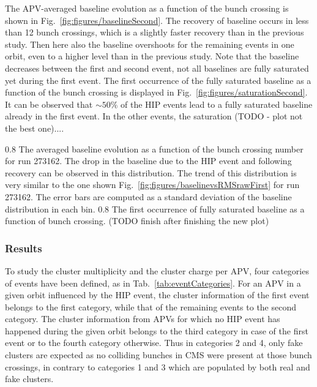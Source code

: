 The APV-averaged baseline evolution as a function of the bunch crossing is shown in Fig.~\ref{fig:figures/baselineSecond}. The recovery of baseline occurs in less than 12 bunch crossings, which is a slightly faster recovery than in the previous study. Then here also the baseline overshoots for the remaining events in one orbit, even to a higher level than in the previous study. Note that the baseline decreases between the first and second event, not all baselines are fully saturated yet during the first event. The first occurrence of the fully saturated baseline as a function of the bunch crossing is displayed in Fig.~\ref{fig:figures/saturationSecond}. It can be observed that $\sim 50\%$ of the HIP events lead to a fully saturated baseline already in the first event. In the other events, the saturation (TODO - plot not the best one)....

                 {0.8}       %
                 {The averaged baseline evolution as a function of the bunch crossing number for run 273162. The drop in the baseline due to the HIP event and following recovery can be observed in this distribution. The trend of this distribution is very similar to the one shown Fig.~\ref{fig:figures/baselinevsRMSrawFirst} for run 273162. The error bars are computed as a standard deviation of the baseline distribution in each bin.  } %
                 {0.8}       %
                 { The first occurrence of fully saturated baseline as a function of bunch crossing. (TODO finish after finishing the new plot) } %
 

\subsubsection{Results}

To study the cluster multiplicity and the cluster charge per APV, four categories of events have been defined, as in Tab.~\ref{tab:eventCategories}. For an APV in a given orbit influenced by the HIP event, the cluster information of the first event belongs to the first category, while that of the remaining events to the second category. The cluster information from APVs for which no HIP event has happened during the given orbit belongs to the third category in case of the first event or to the fourth category otherwise. Thus in categories 2 and 4, only fake clusters are expected as no colliding bunches in CMS were present at those bunch crossings, in contrary to categories 1 and 3 which are populated by both real and fake clusters.

